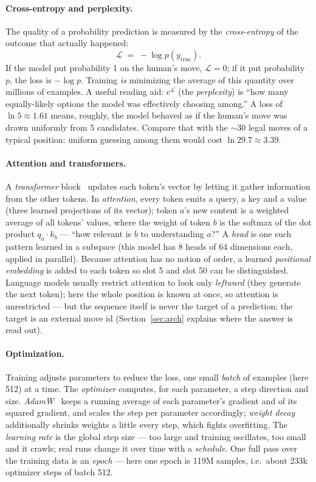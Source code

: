 \documentclass[10pt,a4paper]{article}
\newcommand{\loss}{\ensuremath{\mathcal{L}}}
\begin{document}
\paragraph{Cross-entropy and perplexity.} The quality of a probability
prediction is measured by the \emph{cross-entropy} of the outcome that
actually happened:
\begin{equation}
\loss \;=\; -\log p(y_{\text{true}}).
\label{eq:ce}
\end{equation}
If the model put probability 1 on the human's move, $\loss = 0$; if it put
probability $p$, the loss is $-\log p$. Training \emph{is} minimizing the
average of this quantity over millions of examples. A useful reading aid:
$e^{\loss}$ (the \emph{perplexity}) is ``how many equally-likely options
the model was effectively choosing among.'' A loss of $\ln 5 \approx 1.61$
means, roughly, the model behaved as if the human's move was drawn
uniformly from 5 candidates. Compare that with the $\sim$30 legal moves of
a typical position: uniform guessing among them would cost
$\ln 29.7 \approx 3.39$.

\paragraph{Attention and transformers.} A \emph{transformer}
block~\cite{attention} updates each token's vector by letting it gather
information from the other tokens. In \emph{attention}, every token emits a
query, a key and a value (three learned projections of its vector); token
$a$'s new content is a weighted average of all tokens' values, where the
weight of token $b$ is the softmax of the dot product $q_a \cdot k_b$ ---
``how relevant is $b$ to understanding $a$?'' A \emph{head} is one such
pattern learned in a subspace (this model has 8 heads of 64 dimensions
each, applied in parallel). Because attention has no notion of order, a
learned \emph{positional embedding} is added to each token so slot 5 and
slot 50 can be distinguished. Language models usually restrict attention
to look only \emph{leftward} (they generate the next token); here the
whole position is known at once, so attention is unrestricted --- but the
sequence itself is never the target of a prediction; the target is an
external move id (Section~\ref{sec:arch} explains where the answer is read
out).

\paragraph{Optimization.} Training adjusts parameters to reduce the loss,
one small \emph{batch} of examples (here 512) at a time. The
\emph{optimizer} computes, for each parameter, a step direction and size.
\emph{AdamW}~\cite{adamw} keeps a running average of each parameter's
gradient and of its squared gradient, and scales the step per parameter
accordingly; \emph{weight decay} additionally shrinks weights a little
every step, which fights overfitting. The \emph{learning rate} is the
global step size --- too large and training oscillates, too small and it
crawls; real runs change it over time with a \emph{schedule}. One full
pass over the training data is an \emph{epoch} --- here one epoch is 119M
samples, i.e.\ about 233k optimizer steps of batch 512.
\end{document}
